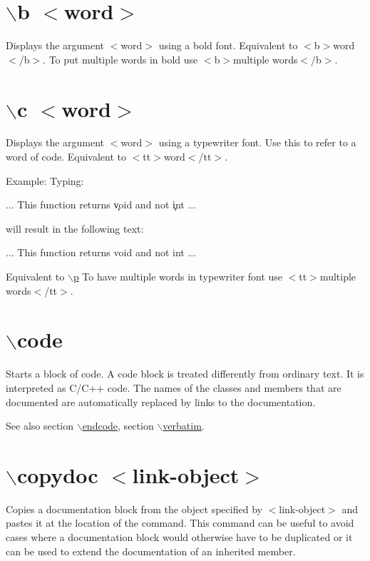  \hypertarget{commands_cmdb}{}\section{$\backslash$b $<$word$>$}\label{commands_cmdb}
 Displays the argument $<$word$>$ using a bold font. Equivalent to $<$b$>$word$<$/b$>$. To put multiple words in bold use $<$b$>$multiple words$<$/b$>$.



 \hypertarget{commands_cmdc}{}\section{$\backslash$c $<$word$>$}\label{commands_cmdc}
 Displays the argument $<$word$>$ using a typewriter font. Use this to refer to a word of code. Equivalent to $<$tt$>$word$<$/tt$>$.

\begin{DoxyParagraph}{Example:}
Typing: \begin{DoxyVerb}
     ... This function returns \c void and not \c int ...
  \end{DoxyVerb}
 will result in the following text:\par
\par
 ... This function returns {\ttfamily void} and not {\ttfamily int} ...
\end{DoxyParagraph}
Equivalent to \hyperlink{commands_cmdp}{$\backslash$p} To have multiple words in typewriter font use $<$tt$>$multiple words$<$/tt$>$.



 \hypertarget{commands_cmdcode}{}\section{$\backslash$code}\label{commands_cmdcode}
 Starts a block of code. A code block is treated differently from ordinary text. It is interpreted as C/C++ code. The names of the classes and members that are documented are automatically replaced by links to the documentation.

\begin{DoxySeeAlso}{See also}
section \hyperlink{commands_cmdendcode}{$\backslash$endcode}, section \hyperlink{commands_cmdverbatim}{$\backslash$verbatim}.
\end{DoxySeeAlso}


 \hypertarget{commands_cmdcopydoc}{}\section{$\backslash$copydoc $<$link-\/object$>$}\label{commands_cmdcopydoc}
 Copies a documentation block from the object specified by $<$link-\/object$>$ and pastes it at the location of the command. This command can be useful to avoid cases where a documentation block would otherwise have to be duplicated or it can be used to extend the documentation of an inherited member.

